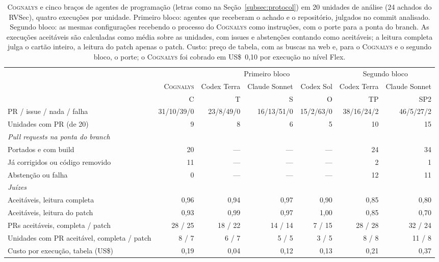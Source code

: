 \documentclass[conference]{IEEEtran}
\newcommand{\system}{\textsc{Cognalys}}
\begin{document}
\begin{table}[t]
\centering
\caption{\system{} e cinco braços de agentes de programação (letras como na
Seção~\ref{subsec:protocol}) em 20 unidades de análise (24 achados do RVSec), quatro execuções por unidade. Primeiro
bloco: agentes que receberam o achado e o repositório, julgados no commit analisado. Segundo
bloco: as mesmas configurações recebendo o processo do \system{} como instruções, com o
porte para a ponta do branch. As execuções aceitáveis são calculadas como média sobre
as unidades, com issues e abstenções contando como aceitáveis; a leitura completa
julga o cartão inteiro, a leitura do patch apenas o patch. Custo: preço de tabela,
com as buscas na web e, para o \system{} e o segundo bloco, o porte; o
\system{} foi cobrado em US\$~0,10 por execução no nível Flex.}
\label{tab:optiona}
\footnotesize
\setlength{\tabcolsep}{4pt}
\begin{tabular}{p{4.2cm}r|rrr|rr}
\toprule
 & & \multicolumn{3}{c|}{Primeiro bloco} & \multicolumn{2}{c}{Segundo bloco} \\
 & \system{} & Codex Terra & Claude Sonnet & Codex Sol & Codex Terra & Claude Sonnet \\
 & C & T & S & O & TP & SP2 \\
\midrule
PR / issue / nada / falha & 31/10/39/0 & 23/8/49/0 & 16/13/51/0 & 15/2/63/0 & 38/16/24/2 & 46/5/27/2 \\
Unidades com PR (de 20) & 9 & 8 & 6 & 5 & 10 & 15 \\
\multicolumn{7}{l}{\emph{Pull requests na ponta do branch}} \\
\quad Portados e com build & 20 & --- & --- & --- & 24 & 34 \\
\quad Já corrigidos ou código removido & 11 & --- & --- & --- & 2 & 1 \\
\quad Abstenção ou falha & 0 & --- & --- & --- & 12 & 11 \\
\multicolumn{7}{l}{\emph{Juízes}} \\
\quad Aceitáveis, leitura completa & 0,96 & 0,94 & 0,97 & 0,90 & 0,85 & 0,80 \\
\quad Aceitáveis, leitura do patch & 0,93 & 0,99 & 0,97 & 1,00 & 0,85 & 0,70 \\
\quad PRs aceitáveis, completa / patch & 28 / 25 & 18 / 22 & 14 / 14 & 7 / 15 & 28 / 28 & 32 / 24 \\
\quad Unidades com PR aceitável, completa / patch & 8 / 7 & 6 / 7 & 5 / 5 & 3 / 5 & 8 / 8 & 11 / 8 \\
Custo por execução, tabela (US\$) & 0,19 & 0,04 & 0,12 & 0,13 & 0,21 & 0,37 \\
\bottomrule
\end{tabular}
\end{table}
\end{document}
